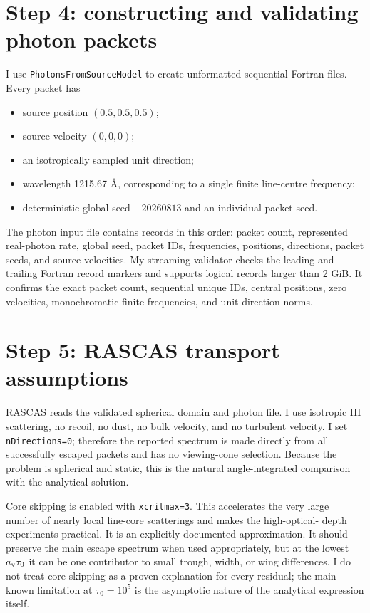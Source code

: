 \documentclass[11pt,a4paper]{article}
\newcommand{\tauzero}{\tau_0}
\newcommand{\av}{a_{\rm v}}
\begin{document}
\section{Step 4: constructing and validating photon packets}

I use \texttt{PhotonsFromSourceModel} to create unformatted sequential Fortran
files.  Every packet has
\begin{itemize}
\item source position $(0.5,0.5,0.5)$;
\item source velocity $(0,0,0)$;
\item an isotropically sampled unit direction;
\item wavelength 1215.67 \AA, corresponding to a single finite line-centre
frequency;
\item deterministic global seed $-20260813$ and an individual packet seed.
\end{itemize}

The photon input file contains records in this order: packet count, represented
real-photon rate, global seed, packet IDs, frequencies, positions, directions,
packet seeds, and source velocities.  My streaming validator checks the leading
and trailing Fortran record markers and supports logical records larger than
2 GiB.  It confirms the exact packet count, sequential unique IDs, central
positions, zero velocities, monochromatic finite frequencies, and unit direction
norms.

\section{Step 5: RASCAS transport assumptions}

RASCAS reads the validated spherical domain and photon file.  I use isotropic
HI scattering, no recoil, no dust, no bulk velocity, and no turbulent velocity.
I set \texttt{nDirections=0}; therefore the reported spectrum is made directly
from all successfully escaped packets and has no viewing-cone selection.
Because the problem is spherical and static, this is the natural angle-integrated
comparison with the analytical solution.

Core skipping is enabled with \texttt{xcritmax=3}.  This accelerates the very
large number of nearly local line-core scatterings and makes the high-optical-
depth experiments practical.  It is an explicitly documented approximation.
It should preserve the main escape spectrum when used appropriately, but at the
lowest $\av\tauzero$ it can be one contributor to small trough, width, or wing
differences.  I do not treat core skipping as a proven explanation for every
residual; the main known limitation at $\tauzero=10^5$ is the asymptotic nature
of the analytical expression itself.
\end{document}
